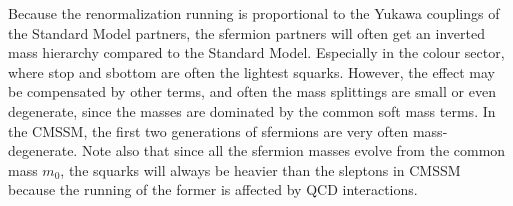 \documentclass[twoside,english]{uiofysmaster}
\begin{document}
Because the renormalization running is proportional to the Yukawa couplings of the Standard Model partners, the sfermion partners will often get an inverted mass hierarchy compared to the Standard Model. Especially in the colour sector, where stop and sbottom are often the lightest squarks. However, the effect may be compensated by other terms, and often the mass splittings are small or even degenerate, since the masses are dominated by the common soft mass terms. In the CMSSM, the first two generations of sfermions are very often mass-degenerate. Note also that since all the sfermion masses evolve from the common mass $m_0$, the squarks will always be heavier than the sleptons in CMSSM because the running of the former is affected by QCD interactions. 
\end{document}
